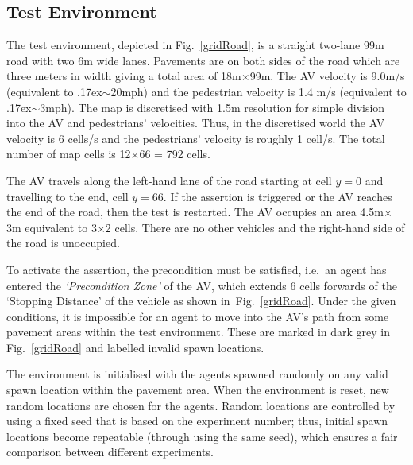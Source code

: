 \documentclass[letterpaper, 10 pt, journal, twoside]{IEEEtran}
\begin{document}
\subsection{Test Environment}
The test environment, depicted in Fig.~\ref{gridRoad}, is a straight two-lane 99m road with two 6m wide lanes. Pavements are on both sides of the road which are three meters in width giving a total area of 18m$\times$99m. 
%
The AV velocity is 9.0m/s (equivalent to {\raise.17ex\hbox{$\scriptstyle\sim$}}20mph) and the pedestrian velocity is 1.4 m/s (equivalent to {\raise.17ex\hbox{$\scriptstyle\sim$}}3mph). The map is discretised with 1.5m resolution for simple division into the AV and pedestrians' velocities. Thus, in the discretised world the AV velocity is 6 cells/s and the pedestrians' velocity is roughly 1 cell/s. The total number of map cells is 12$\times$66 = 792 cells. 

The AV travels along the left-hand lane of the road starting at cell $y=0$ and travelling to the end, cell $y=66$. If the assertion is triggered
 or the AV reaches the end of the road, then the test is restarted. The AV occupies an area 4.5m$\times$3m equivalent to 3$\times$2 cells. There are no other vehicles and the right-hand side of the road is unoccupied.

To activate the assertion, the precondition must be satisfied, i.e.\ an agent has entered the \textit{`Precondition Zone'} of the AV, which extends 6 cells forwards of the `Stopping Distance' of the vehicle as shown in~Fig.~\ref{gridRoad}. 
%
Under the given conditions, it is impossible for an agent to move into the AV's path from some pavement areas within the test environment. These are marked in dark grey in Fig.~\ref{gridRoad} and labelled invalid spawn locations. 

The environment is initialised with the agents spawned randomly on any valid spawn location within the pavement area. When the environment is reset, new random locations are chosen for the agents. Random locations are controlled by using a fixed seed that is based on the experiment number; thus, initial spawn locations become repeatable (through using the same seed), which ensures a fair comparison between different experiments.

\end{document}
